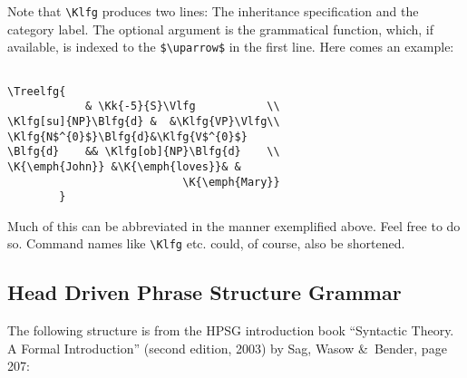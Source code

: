 \documentclass[12pt,a4paper]{article}
\begin{document}
Note that \verb|\Klfg| produces two lines: The inheritance specification and the
category label. The optional argument is the grammatical function, which, if
available, is indexed to the \verb|$\uparrow$| in the first line. Here comes an
example:  \vspace*{-3ex}

\begin{minipage}[t]{4.5cm}
\end{minipage}
\begin{minipage}[t]{9cm}
\begin{verbatim}

\Treelfg{
            & \Kk{-5}{S}\Vlfg           \\
\Klfg[su]{NP}\Blfg{d} &  &\Klfg{VP}\Vlfg\\
\Klfg{N$^{0}$}\Blfg{d}&\Klfg{V$^{0}$}
\Blfg{d}    && \Klfg[ob]{NP}\Blfg{d}    \\
\K{\emph{John}} &\K{\emph{loves}}& &
                           \K{\emph{Mary}}
        }
\end{verbatim}
\end{minipage}

Much of this can be abbreviated in the manner exemplified above. Feel free to do
so. Command names like \verb|\Klfg| etc. could, of course, also be shortened.


\subsection{Head Driven Phrase Structure Grammar}

The following structure is from the HPSG introduction book ``Syntactic
Theory. A Formal Introduction'' (second edition, 2003) by Sag, Wasow \&\
Bender, page 207:

\newcommand{\AVMone}{\begin{avm}\@1NP$_{i}$\end{avm}}
\newcommand{\AVMtwo}{\begin{avm} \[ SPR & \q< \@1 \q> \\ COMPS & \q<~ \q> \] \end{avm}}
\newcommand{\AVMthree}{\begin{avm} \[ SPR & \q< \@1 \q> \\ COMPS & \q< \@2 \q> \\
                                      ARG-ST & \q< \@1 , \@2 \q> \]            \end{avm}}
\newcommand{\AVMfour}{\begin{avm}\@2NP$_{i}$\end{avm}}
\end{document}
